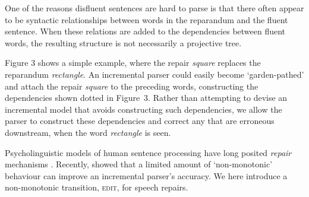 \documentclass[11pt,letterpaper]{article}
\begin{document}
One of the reasons disfluent sentences are hard to parse is that there often appear
to be syntactic relationships between words in the reparandum and the fluent sentence.
When these relations are added to the dependencies between fluent words,
the resulting structure is not necessarily a projective tree.


Figure 3 shows a simple example, where the repair {\em square} replaces the
reparandum {\em rectangle}.  An incremental parser could easily become
`garden-pathed' and attach the repair {\em square} to the preceding words,
constructing the dependencies shown dotted in Figure~3.  Rather than attempting
to devise an incremental model that avoids constructing such dependencies, we
allow the parser to construct these dependencies and correct any that are erroneous
downstream, when the word {\em rectangle} is seen.

Psycholinguistic models of human sentence processing have long posited
\emph{repair} mechanisms \citep{FrazierRayner1982}.  Recently, \citet{honnibal:13}
showed that a limited amount of `non-monotonic' behaviour can 
improve an incremental parser's accuracy.
We here introduce a non-monotonic transition, \textsc{edit}, for speech
repairs. 
\end{document}
